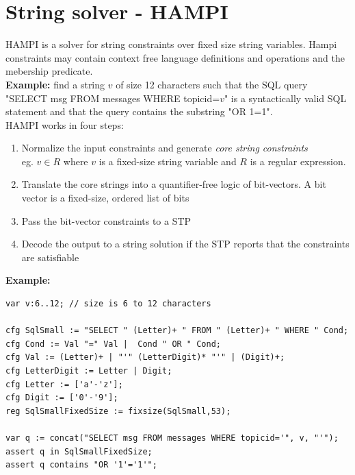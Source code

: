 \documentclass[10pt,a4paper]{article}
\begin{document}
\section{String solver - HAMPI}
HAMPI is a solver for string constraints over fixed size string variables. Hampi constraints may contain context free language definitions and operations and the mebership predicate. \\
{\bf Example:} find a string $v$ of size 12 characters such that the SQL query "SELECT msg FROM messages WHERE topicid=$v$" is a syntactically valid SQL statement and that the query contains the substring "OR 1=1".\\
HAMPI works in four steps:
\begin{enumerate}
\item Normalize the input constraints and generate \emph{core string constraints}\\
eg. $v\in R$ where $v$ is a fixed-size string variable and $R$ is a regular expression.
\item Translate the core strings into a quantifier-free logic of bit-vectors. A bit vector is a fixed-size, ordered list of bits
\item Pass the bit-vector constraints to a STP
\item Decode the output to a string solution if the STP reports that the constraints are satisfiable
\end{enumerate}
{\bf Example:}
\begin{verbatim}
var v:6..12; // size is 6 to 12 characters

cfg SqlSmall := "SELECT " (Letter)+ " FROM " (Letter)+ " WHERE " Cond;
cfg Cond := Val "=" Val |  Cond " OR " Cond;
cfg Val := (Letter)+ | "'" (LetterDigit)* "'" | (Digit)+;
cfg LetterDigit := Letter | Digit;
cfg Letter := ['a'-'z'];
cfg Digit := ['0'-'9'];
reg SqlSmallFixedSize := fixsize(SqlSmall,53);

var q := concat("SELECT msg FROM messages WHERE topicid='", v, "'");
assert q in SqlSmallFixedSize;
assert q contains "OR '1'='1'";
\end{verbatim}
\end{document}
